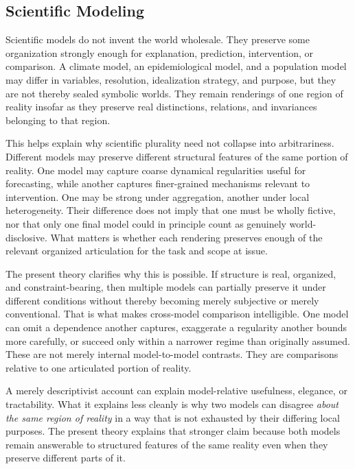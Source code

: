 \documentclass[11pt]{article}
\renewcommand{\emph}[1]{\textit{#1}}
\begin{document}
\subsection{Scientific Modeling}

Scientific models do not invent the world wholesale. They preserve some organization strongly enough for explanation, prediction, intervention, or comparison. \cite{FriggHartmann2025ModelsScienceSEP,FriggNguyen2021ScientificRepresentationSEP} A climate model, an epidemiological model, and a population model may differ in variables, resolution, idealization strategy, and purpose, but they are not thereby sealed symbolic worlds. They remain renderings of one region of reality insofar as they preserve real distinctions, relations, and invariances belonging to that region.

This helps explain why scientific plurality need not collapse into arbitrariness. Different models may preserve different structural features of the same portion of reality. One model may capture coarse dynamical regularities useful for forecasting, while another captures finer-grained mechanisms relevant to intervention. One may be strong under aggregation, another under local heterogeneity. Their difference does not imply that one must be wholly fictive, nor that only one final model could in principle count as genuinely world-disclosive. What matters is whether each rendering preserves enough of the relevant organized articulation for the task and scope at issue. \cite{Giere2006ScientificPerspectivism,Massimi2022PerspectivalRealism,Chang2022RealismForRealisticPeople}

The present theory clarifies why this is possible. If structure is real, organized, and constraint-bearing, then multiple models can partially preserve it under different conditions without thereby becoming merely subjective or merely conventional. That is what makes cross-model comparison intelligible. One model can omit a dependence another captures, exaggerate a regularity another bounds more carefully, or succeed only within a narrower regime than originally assumed. These are not merely internal model-to-model contrasts. They are comparisons relative to one articulated portion of reality.

A merely descriptivist account can explain model-relative usefulness, elegance, or tractability. What it explains less cleanly is why two models can disagree \emph{about the same region of reality} in a way that is not exhausted by their differing local purposes. The present theory explains that stronger claim because both models remain answerable to structured features of the same reality even when they preserve different parts of it.
\end{document}
